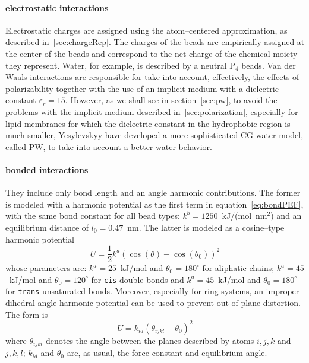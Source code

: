 \paragraph{\textbf{electrostatic interactions}} Electrostatic charges are assigned using the atom--centered
approximation, as described in~\ref{sec:chargeRep}. The charges of the \martini beads are empirically assigned at
the center of the beads and correspond to the net charge of the chemical moiety they represent. Water, for
example, is described by a neutral P$_4$ beads. Van der Waals interactions are responsible for take into account,
effectively, the effects of polarizability together with the use of an implicit medium with a dielectric constant
$\varepsilon_r = 15$. However, as we shall see in section~\ref{sec:pw}, to avoid the problems with the implicit
medium described in~\ref{sec:polarization}, especially for lipid membranes for which the dielectric constant in
the hydrophobic region is much smaller, Yesylevskyy \etal \cite{PW} have developed a more sophisticated \ac{CG}
water model, called \ac{PW}, to take into account a better water behavior.

\paragraph{\textbf{bonded interactions}} They include only bond length and an angle harmonic contributions. The
former is modeled with a harmonic potential as the first term in equation~\eqref{eq:bondPEF}, with the same bond
constant for all bead types: $k^b = 1250$~kJ/(mol\ nm$^2$) and an equilibrium distance of $l_0 = 0.47$~nm. The
latter is modeled as a cosine--type harmonic potential
\begin{equation}
	U = \frac{1}{2}k^a (\cos(\theta) - \cos(\theta_0))^2
	\label{eq:martiniAngle}
\end{equation}
whose parameters are: $k^a = 25$~kJ/mol and $\theta_0 = 180^\circ$ for aliphatic chains; $k^a = 45$~kJ/mol and
$\theta_0 = 120^\circ$ for \texttt{cis} double bonds and $k^a = 45$~kJ/mol and $\theta_0 = 180^\circ$ for
\texttt{trans} unsaturated bonds. Moreover, especially for ring systems, an improper dihedral angle harmonic
potential can be used to prevent out of plane distortion. The form is
\begin{equation*}
	U = k_{id} (\theta_{ijkl} - \theta_0)^2
\end{equation*}
where $\theta_{ijkl}$ denotes the angle between the planes described by atoms $i,j,k$ and $j,k,l$; $k_{id}$ and
$\theta_0$ are, as usual, the force constant and equilibrium angle.

